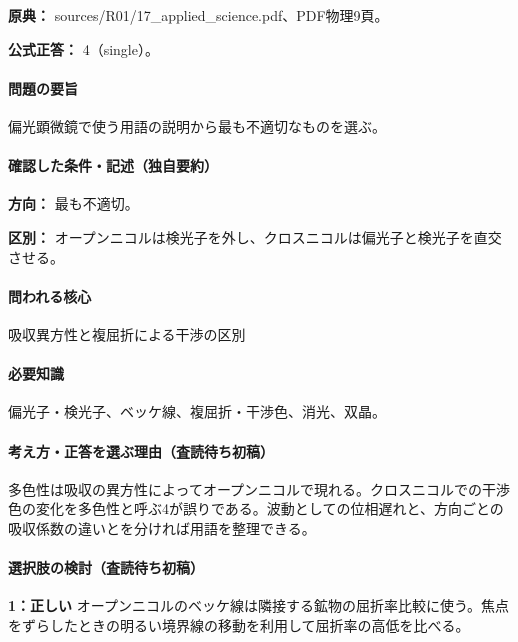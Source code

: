 \noindent\textbf{原典：} sources/R01/17\_applied\_science.pdf、PDF物理9頁。

\textbf{公式正答：} 4（single）。

\paragraph{問題の要旨} 偏光顕微鏡で使う用語の説明から最も不適切なものを選ぶ。

\paragraph{確認した条件・記述（独自要約）}\mbox{}\par

\noindent\textbf{方向：} 最も不適切。\par

\noindent\textbf{区別：} オープンニコルは検光子を外し、クロスニコルは偏光子と検光子を直交させる。\par

\paragraph{問われる核心} 吸収異方性と複屈折による干渉の区別

\paragraph{必要知識} 偏光子・検光子、ベッケ線、複屈折・干渉色、消光、双晶。

\paragraph{考え方・正答を選ぶ理由（査読待ち初稿）} 多色性は吸収の異方性によってオープンニコルで現れる。クロスニコルでの干渉色の変化を多色性と呼ぶ4が誤りである。波動としての位相遅れと、方向ごとの吸収係数の違いとを分ければ用語を整理できる。

\paragraph{選択肢の検討（査読待ち初稿）}\mbox{}\par

\noindent\textbf{1：正しい} オープンニコルのベッケ線は隣接する鉱物の屈折率比較に使う。焦点をずらしたときの明るい境界線の移動を利用して屈折率の高低を比べる。\par

